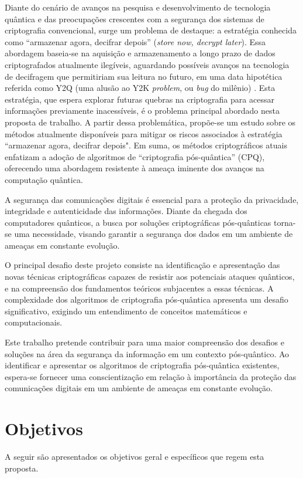 Diante do cenário de avanços na pesquisa e desenvolvimento de tecnologia quântica e das preocupações crescentes com a segurança dos sistemas de criptografia convencional, surge um problema de destaque: a estratégia conhecida como ``armazenar agora, decifrar depois'' (\textit{store now, decrypt later}). Essa abordagem baseia-se na aquisição e armazenamento a longo prazo de dados criptografados atualmente ilegíveis, aguardando possíveis avanços na tecnologia de decifragem que permitiriam sua leitura no futuro, em uma data hipotética referida como Y2Q (uma alusão ao Y2K \textit{problem}, ou \textit{bug} do milênio) \cite{argetsinger2024promise}. Esta estratégia, que espera explorar futuras quebras na criptografia para acessar informações previamente inacessíveis, é o problema principal abordado nesta proposta de trabalho. A partir dessa problemática, propõe-se um estudo sobre os métodos atualmente disponíveis para mitigar os riscos associados à estratégia ``armazenar agora, decifrar depois". Em suma, os métodos criptográficos atuais enfatizam a adoção de algoritmos de  ``criptografia pós-quântica'' (CPQ), oferecendo uma abordagem resistente à ameaça iminente dos avanços na computação quântica.

A segurança das comunicações digitais é essencial para a proteção da privacidade, integridade e autenticidade das informações. Diante da chegada dos computadores quânticos, a busca por soluções criptográficas pós-quânticas torna-se uma necessidade, visando garantir a segurança dos dados em um ambiente de ameaças em constante evolução.

O principal desafio deste projeto consiste na identificação e apresentação das novas técnicas criptográficas capazes de resistir aos potenciais ataques quânticos, e na compreensão dos fundamentos teóricos subjacentes a essas técnicas. A complexidade dos algoritmos de criptografia pós-quântica apresenta um desafio significativo, exigindo um entendimento de conceitos matemáticos e computacionais.

Este trabalho pretende contribuir para uma maior compreensão dos desafios e soluções na área da segurança da informação em um contexto pós-quântico. Ao identificar e apresentar os algoritmos de criptografia pós-quântica existentes, espera-se fornecer uma conscientização em relação à importância da proteção das comunicações digitais em um ambiente de ameaças em constante evolução.

\section{Objetivos}\label{sec:objetivos}
A seguir são apresentados os objetivos geral e específicos que regem esta proposta.


